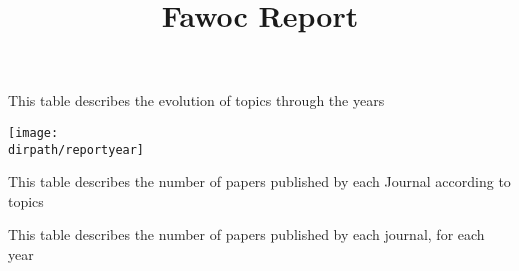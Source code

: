 \documentclass{article}
\newcommand*{\dirpath}{.}%
\begin{document}
	\title{Fawoc Report}
	\maketitle

	

	\begin{table}[h]
		\centering
		
		\caption{This table describes the evolution of topics through the years}
	\end{table}
	
	
	\texttt{[image: \\dirpath/reportyear]}
	

	\begin{table} 
		\centering
		
		\caption{This table describes the number of papers published by each Journal according to topics}
	\end{table}


	\begin{table}
		\centering
		
		\caption{This table describes the number of papers published by each journal, for each year}
	\end{table}
\end{document}
